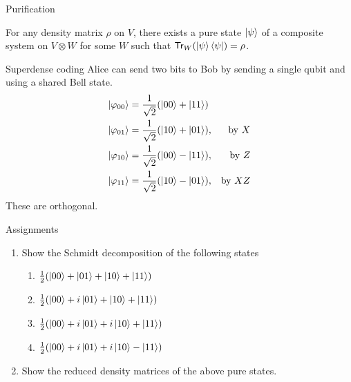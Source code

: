 \documentclass[10pt]{beamer}
\newcommand{\Tr}{\mathsf{Tr}}
\newcommand\emm[1]{\textcolor{redorange}{{#1}}}
\begin{document}
\begin{frame}{Purification}
\begin{theorem}
For any density matrix $\rho$ on $V$, there exists a pure state $\ket{\psi}$ of a composite system on $V\otimes W$ for some $W$ such that $\Tr_W(\ket{\psi}\bra{\psi})=\rho$.
\end{theorem}
\end{frame}
\fi

\begin{frame}{Superdense coding}
Alice can send \emm{two} bits to Bob by sending a single qubit and using a shared Bell state.
\begin{align*}
\ket{\varphi_{00}} &= \frac1{\sqrt{2}}(\ket{00}+\ket{11})\\
\ket{\varphi_{01}} &= \frac1{\sqrt{2}}(\ket{10}+\ket{01}),& \text{by $X$}\\
\ket{\varphi_{10}} &= \frac1{\sqrt{2}}(\ket{00}-\ket{11}),& \text{by $Z$}\\
\ket{\varphi_{11}} &= \frac1{\sqrt{2}}(\ket{10}-\ket{01}),& \text{by $XZ$}\\
\end{align*}
These are \emm{orthogonal}.
\end{frame}
\fi



\begin{frame}{Assignments}
\begin{enumerate}
\setlength{\itemsep}{2em}
\item Show the Schmidt decomposition of the following states
\begin{enumerate}[A]
\setlength{\itemsep}{1em}
\item $\frac12(\ket{00}+\ket{01}+\ket{10}+\ket{11})$
\item $\frac12(\ket{00}+i\ket{01}+\ket{10}+\ket{11})$
\item $\frac12(\ket{00}+i\ket{01}+i\ket{10}+\ket{11})$
\item $\frac12(\ket{00}+i\ket{01}+i\ket{10}-\ket{11})$
\end{enumerate}
\item Show the reduced density matrices of the above pure states.
\end{enumerate}
\end{frame}
\end{document}
